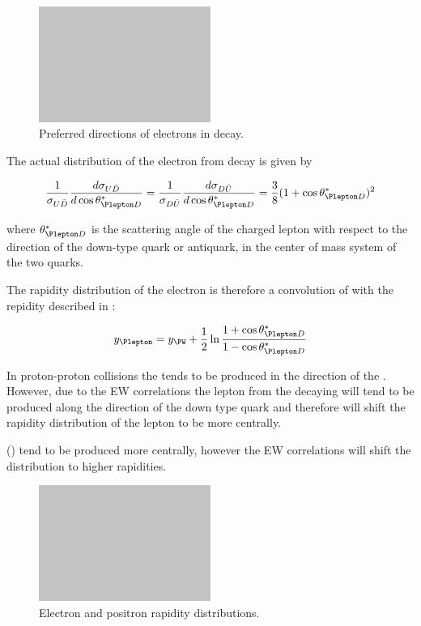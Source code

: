 \begin{figure}[htb]
  \centering
  \includegraphics[width=0.5\textwidth]{placeholder}
  \caption{Preferred directions of electrons in \Wenu decay.}
  \label{wbos:wspin}
\end{figure}

The actual distribution of the electron from \PWpm decay is given by

\begin{equation}
  \frac{1}{\sigma_{U\bar{D}}}
  \frac{d \sigma_{U\bar{D}}}{d \cos \theta_{\Plepton D}^{\ast}}
  =
  \frac{1}{\sigma_{D\bar{U}}}
  \frac{d \sigma_{D\bar{U}}}{d \cos \theta_{\Plepton D}^{\ast}}
  =
  \frac{3}{8}(1+\cos \theta_{\Plepton D}^{\ast})^2
  \label{wbos:lepton}
\end{equation}

where $\theta_{\Plepton D}^{\ast}$ is the scattering angle of the charged
lepton with respect to the direction of the down-type quark or antiquark, in
the center of mass system of the two quarks.

The rapidity distribution of the electron is therefore a convolution of
 with the \PW repidity described in
:

\begin{equation}
  y_{\Plepton} = 
  y_{\PW} +
  \frac{1}{2}
  \ln
  \frac{1 + \cos \theta_{\Plepton D}^{\ast}}{1 - \cos \theta_{\Plepton D}^{\ast}}
  \label{wbos:leptonfull}
\end{equation}

In proton-proton collisions the \PWp tends to be produced in the direction
of the \Pup. However, due to the EW correlations the lepton from the decaying
\PWp will tend to be produced along the direction of the down type quark and
therefore will shift the rapidity distribution of the lepton to be more
centrally.

\PWm () tend to be produced more centrally, however
the EW correlations will shift the distribution to higher rapidities.


\begin{figure}[htb]
  \centering
  \includegraphics[width=0.5\textwidth]{placeholder}
  \caption{Electron and positron rapidity distributions.}
  \label{wbos:leptonrapidity}
\end{figure}

